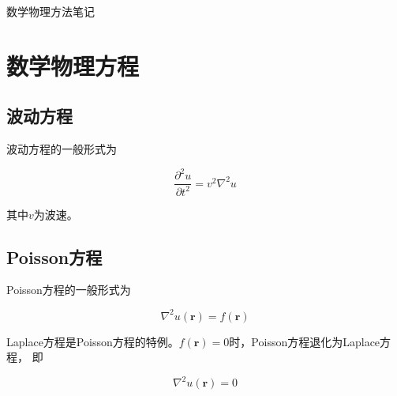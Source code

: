 \documentclass[UTF8,fontset=fandol,zihao=5]{ctexart}
\let\bm\boldsymbol
\begin{document}
\begin{center}
  {\heiti\headingfont{}\color{main} 数学物理方法笔记}
\end{center}

\section{数学物理方程}

\subsection{波动方程}

波动方程的一般形式为

\[
\frac{\partial^2 u}{\partial t^2} = v^2 \nabla^2 u
\]

其中$v$为波速。

\subsection{Poisson方程}

Poisson方程的一般形式为

\[
\nabla^2 u(\bm{r}) = f(\bm{r})
\]

Laplace方程是Poisson方程的特例。$f(\bm{r})=0$时，Poisson方程退化为Laplace方程，
即

\[
\nabla^2 u(\bm{r}) = 0
\]
\end{document}
